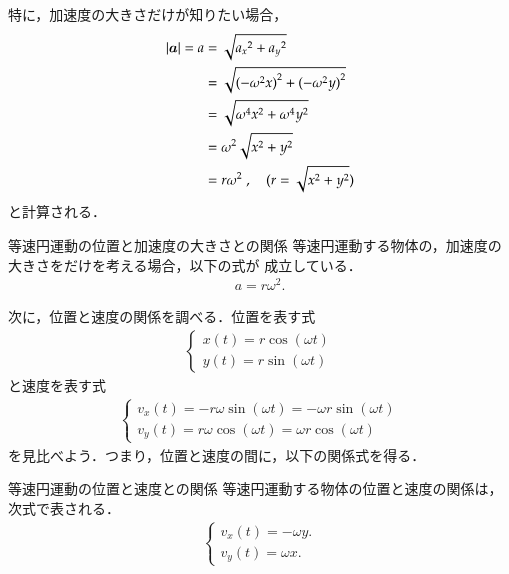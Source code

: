                 特に，加速度の大きさだけが知りたい場合，
                    \begin{align*}
                        |\boldsymbol{a}| = a &= \sqrt{ {a_{x}}^{2}  +  {a_{y}}^{2} }   \\
                                    &= \sqrt{ {(-\omega^{2}x)}^{2}  +  {(-\omega^{2} y)}^{2} }  \\
                                    &= \sqrt{ \omega^{4}x^{2} + \omega^{4}y^{2} } \\
                                    &= \omega^{2} \sqrt{x^{2} + y^{2} } \\
                                    &= r\omega^{2} \;,\quad ( r = \sqrt{ x^{2} + y^{2} } )
                    \end{align*}
                と計算される．
                    \begin{myshadebox}{等速円運動の位置と加速度の大きさとの関係}
                        等速円運動する物体の，加速度の大きさをだけを考える場合，以下の式が
                        成立している．
                            \begin{align}
                                    a = r\omega^{2}.
                            \end{align}
                    \end{myshadebox}

                次に，位置と速度の関係を調べる．位置を表す式
                    \begin{align*}
                        \begin{cases}
                        \displaystyle x(t) = r\cos( \omega t ) \\
                        \displaystyle y(t) = r\sin( \omega t )
                        \end{cases}
                    \end{align*}
                と速度を表す式
                    \begin{align*}
                        \begin{cases}
                        \displaystyle v_{x}(t) = -r\omega \sin(\omega t) = -\omega r\sin(\omega t) \\
                        \displaystyle v_{y}(t) = r\omega \cos(\omega t)  = \omega r\cos(\omega t)
                        \end{cases}
                    \end{align*}
                を見比べよう．つまり，位置と速度の間に，以下の関係式を得る．
                    \begin{myshadebox}{等速円運動の位置と速度との関係}
                        等速円運動する物体の位置と速度の関係は，次式で表される．
                        \begin{align}
                            \begin{cases}
                            \displaystyle v_{x}(t) = -\omega y. \\
                            \displaystyle v_{y}(t) = \omega  x.
                            \end{cases}
                        \end{align}
                    \end{myshadebox}

